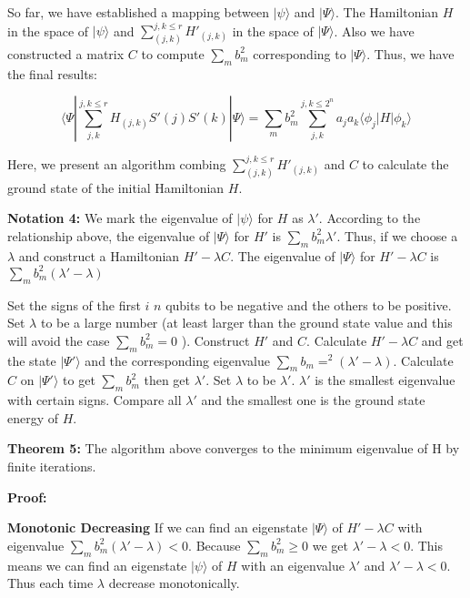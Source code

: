 \documentclass{article}
\begin{document}
So far, we have established a mapping between $|\psi\rangle$ and $|\Psi\rangle$. The Hamiltonian $H$ in the space of $|\psi\rangle$ and $\sum_{(j,k)}^{j,k\leq r}H'_{(j,k)}$ in the space of $|\Psi\rangle$. Also we have constructed a matrix $C$ to compute $\sum_mb_m^2$ corresponding to  $|\Psi\rangle$. Thus, we have the final results:

\begin{equation}
\langle\Psi|\sum_{j,k}^{j,k\leq r}H_{(j,k)}S'(j)S'(k)|\Psi\rangle=\sum_mb_m^2\sum_{j,k}^{j,k\leq 2^n} a_ja_k\langle\phi_j|H|\phi_k\rangle
\end{equation}

Here, we present an algorithm combing $\sum_{(j,k)}^{j,k\leq r}H'_{(j,k)}$ and $C$ to calculate the ground state  of the initial Hamiltonian $H$.

{\bf Notation 4:} We mark the eigenvalue of $|\psi\rangle$ for $H$ as $\lambda'$. According to the relationship above, the eigenvalue of $|\Psi\rangle$ for $H'$ is $\sum_m b_m^2\lambda'$. Thus, if we choose a $\lambda$ and construct a Hamiltonian $H'-\lambda C$. The eigenvalue of $|\Psi\rangle$ for $H'-\lambda C$ is $\sum_mb_m^2(\lambda'-\lambda)$

\begin{algorithm}
\caption{}
\begin{algorithmic}
\STATE Set the signs of the first $i$ $n$ qubits to be negative and the others to be positive. Set $\lambda$ to be a large number (at least larger than the ground state value and this will avoid the case $\sum_mb_m^2=0$ ).
\STATE Construct $H'$ and $C$.
\STATE Calculate $H'-\lambda C$ and get the state $|\Psi'\rangle$ and the corresponding eigenvalue $\sum_{m}b_m=^2(\lambda'-\lambda) $.
\STATE Calculate $C$ on $|\Psi'\rangle$ to get $\sum_mb_m^2$ then get $\lambda'$. Set $\lambda$ to be $\lambda'$.
\ENDWHILE
\STATE $\lambda'$ is the smallest eigenvalue with certain signs.
\ENDFOR
\STATE Compare all $\lambda'$ and the smallest one is the ground state energy of $H$.
\end{algorithmic}
\end{algorithm}

{\bf Theorem 5:} The algorithm above converges to the minimum eigenvalue of H by finite iterations.

{\bf Proof:} 

{\bf Monotonic Decreasing} If we can find an eigenstate $|\Psi\rangle$ of $H'-\lambda C$ with eigenvalue $\sum_m b_m^2 (\lambda'-\lambda) < 0$. Because $\sum_m b_m^2\geq 0$ we get $\lambda'-\lambda<0 $. This means we can find an eigenstate $|\psi\rangle$ of $H$ with an eigenvalue $\lambda'$ and $\lambda'-\lambda<0$. Thus each time $\lambda$ decrease monotonically.
\end{document}
